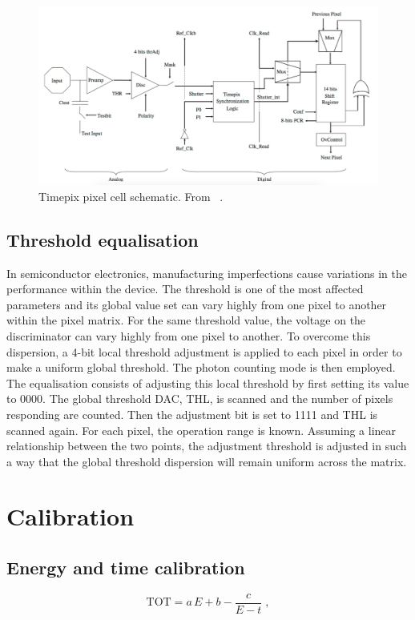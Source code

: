 \begin{figure}[htbp] 
  \centering
  \includegraphics[width=\textwidth]{./figures/Calibration/Timepix_pixel_cell_schematic.jpg}
  \caption{Timepix pixel cell schematic. From ~\cite{art:tmpx}.}
  \label{fig:Timepix_pixel_cell_schematic}
\end{figure}

\subsection{Threshold equalisation} \label{sec:ThresholdEqualisation}
In semiconductor electronics, manufacturing imperfections cause
variations in the performance within the device. The threshold is one
of the most affected parameters and its global value set can vary
highly from one pixel to another within the pixel matrix. For the same
threshold value, the voltage on the discriminator can vary highly from
one pixel to another. To overcome this dispersion, a 4-bit local
threshold adjustment is applied to each pixel in order to make a
uniform global threshold. The photon counting mode is then
employed. The equalisation consists of adjusting this local threshold
by first setting its value to 0000. The global threshold DAC, THL, is
scanned and the number of pixels responding are counted. Then the
adjustment bit is set to 1111 and THL is scanned again. For each
pixel, the operation range is known. Assuming a linear relationship
between the two points, the adjustment threshold is adjusted in such a
way that the global threshold dispersion will remain uniform across
the matrix.


\section{Calibration} \label{sec:calibration}
\subsection{Energy and time
  calibration} \label{sec:TOT_TOA_calibration}
\begin{equation}
  \text{TOT} = a \, E + b - \frac{c}{E - t} \; ,
  \label{eq:TOTsurrogateFunction}
\end{equation}


